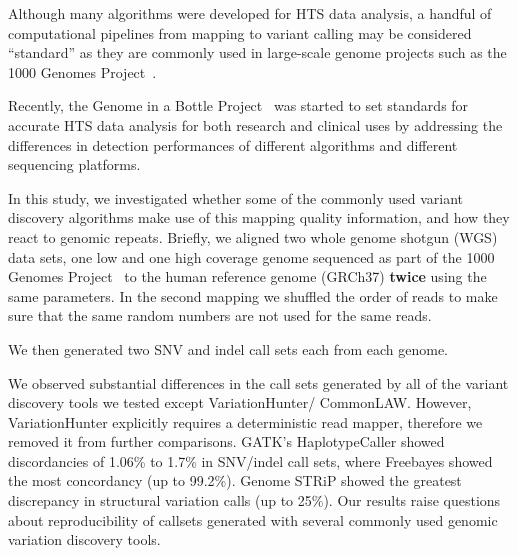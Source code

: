 \documentclass{bioinfo}
\newcommand{\junk}[1]{}
\begin{document}
Although many algorithms were developed for HTS data analysis, a handful of computational pipelines from mapping to variant calling may be considered ``standard'' as they are commonly used in large-scale genome projects such as the 1000 Genomes Project~\citep{1000GP2015}. 
\junk {For example, to discover and genotype variants using Illumina data, first the reads are mapped to reference genome assembly using BWA-MEM~\citep{Li2013}, Bowtie~\citep{Langmead2009}, or a similar tool~\citep{Alkan2009,Weese2012} then the alignment files are processed using SAMtools~\citep{Li2009b} and Picard\footnote{\href{http://broadinstitute.github.io/picard/}{http://broadinstitute.github.io/picard/}}, and finally the single nucleotide variants (SNV) and indels are predicted and filtered using GATK~\citep{DePristo2011}, Platypus~\citep{Rimmer2014}, or Freebayes~\citep{Garrison2012}. 
Structural variation (SV) discovery is even more challenging as exemplified by the 1000 Genomes Project~\citep{1000GP2015,Mills2011}, where more than 20 algorithms were used to characterize SVs.
} 
Recently, the Genome in a Bottle Project~\citep{Zook2014} was started to set standards for accurate HTS data analysis for both research and clinical uses by addressing the differences in detection performances 
of different algorithms and different sequencing platforms.

In this study, we investigated whether some of the commonly used variant discovery algorithms
make use of this mapping quality information, and how they react to genomic repeats.
Briefly, 
we aligned two whole genome shotgun (WGS) data sets, one low and one high coverage genome
sequenced as part of the 1000 Genomes Project~\citep{1000GP2015} to the human reference genome (GRCh37) {\bf twice} using the same parameters. 
In the second mapping 
we shuffled the order of reads  to make sure that the same random numbers are not used for the same reads. 
\junk{ In a small scale test, we did not observe any differences
in the alignment files when we used deterministic aligners such as Bowtie~\citep{Langmead2009} and mrFAST~\citep{Alkan2009};
however, 
the map locations reported by BWA-MEM in repetitive regions differed among replications ($\sim$2.1\% of reads) as expected due to its random placement strategy.}
We then generated two SNV and indel call sets each from each genome.

We observed substantial differences in the call sets generated by all of the variant discovery tools we tested except VariationHunter/ CommonLAW. However, VariationHunter explicitly requires
 a deterministic read mapper, therefore we removed it from further comparisons. GATK's HaplotypeCaller showed discordancies of 1.06\% to 1.7\% in SNV/indel call sets,
 where Freebayes showed the most concordancy (up to 99.2\%). Genome STRiP showed the greatest discrepancy in structural variation calls (up to 25\%).
Our results raise questions about reproducibility of callsets generated with several commonly used genomic variation discovery tools.
\end{document}
